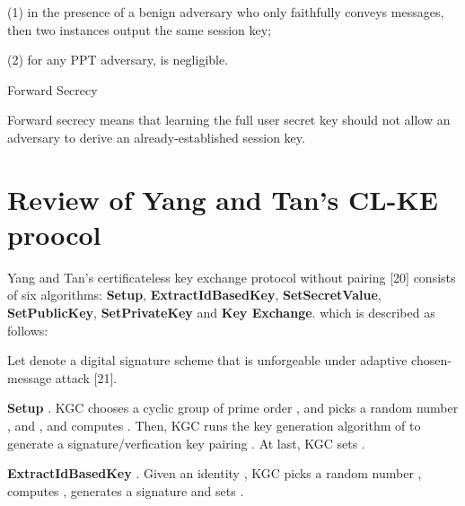 \documentclass[final,1p,times,twocolumn]{elsarticle}
\begin{document}
\vspace{0.1cm}

(1) in the presence of a benign adversary who only faithfully conveys messages, then two instances output the same session key;

\vspace{0.1cm}

(2) for any PPT adversary,  is negligible.

\vspace{0.2cm}

\noindent  Forward Secrecy

\vspace{0.1cm}

Forward secrecy means that learning the full user secret key should not allow an adversary to derive an already-established session key.

\vspace{0.3cm}




\section{Review of Yang and Tan's CL-KE proocol}
\label{3}

\vspace{0.1cm}

Yang and Tan's certificateless key exchange protocol without pairing [20] consists of six algorithms: {\bf Setup}, {\bf ExtractIdBasedKey}, {\bf SetSecretValue}, {\bf SetPublicKey}, {\bf SetPrivateKey} and {\bf Key Exchange}. which is described as follows:

\vspace{0.1cm}

Let  denote a digital signature scheme that is unforgeable under adaptive chosen-message attack [21].

\vspace{0.1cm}

{\bf Setup  }. KGC chooses a cyclic group  of prime order , and picks a random number , and , and computes  . Then, KGC runs the key generation algorithm of  to generate a signature/verfication key pairing . At last, KGC sets .

\vspace{0.2cm}

{\bf ExtractIdBasedKey }. Given an identity , KGC picks a random number , computes , generates a signature  and sets .

\vspace{0.2cm}
\end{document}
